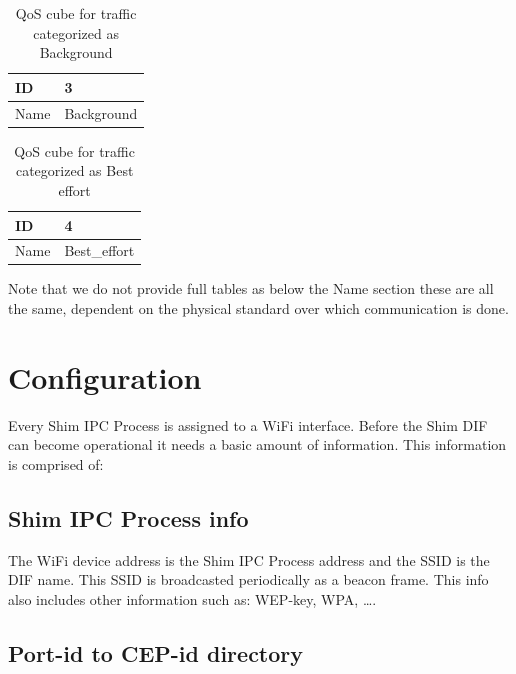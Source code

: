 \npar

\begin{table}[H]
	\begin{center}
		\begin{tabular}{|l|l|}
			\hline
				ID & 3  \\ \hline
				Name & Background \\ \hline
		\end{tabular}
		\caption{QoS cube for traffic categorized as Background}
	\end{center}
\end{table}

\npar

\begin{table}[H]
	\begin{center}
		\begin{tabular}{|l|l|}
			\hline
				ID & 4  \\ \hline
				Name & Best\_effort  \\ \hline
		\end{tabular}
		\caption{QoS cube for traffic categorized as Best effort}
	\end{center}
\end{table}

Note that we do not provide full tables as below the Name section these are all the same, dependent on the physical standard over which communication is done. 

\section{Configuration}

Every Shim IPC Process is assigned to a WiFi interface. Before the Shim DIF can become operational it needs a basic amount of information. This information is comprised of:

\subsection{Shim IPC Process info}

The WiFi device address is the Shim IPC Process address and the SSID is the DIF name. This SSID is broadcasted periodically as a beacon frame. This info also includes other information such as: WEP-key, WPA, \ldots.

\subsection{Port-id to CEP-id directory}

